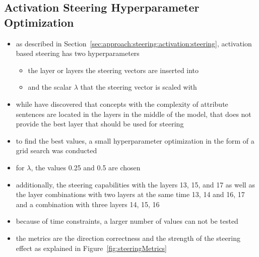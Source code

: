 \subsection{Activation Steering Hyperparameter Optimization}%
\label{sec:evaluation:steering:activationHPO}
\begin{itemize}
  \item as described in Section~\ref{sec:approach:steering:activation:steering}, activation based steering has two hyperparameters
        \begin{itemize}
          \item the layer or layers the steering vectors are inserted into
          \item and the scalar \(\lambda\) that the steering vector is scaled with
        \end{itemize}
  \item while \citet{konenStyleVectorsSteering2024,bogdanEmergentEffectsScaling2025} have discovered that concepts with the complexity of attribute sentences are located in the layers in the middle of the model, that does not provide the best layer that should be used for steering
  \item to find the best values, a small hyperparameter optimization in the form of a grid search was conducted
  \item for \(\lambda\), the values \num{0.25} and \num{0.5} are chosen
  \item additionally, the steering capabilities with the layers \num{13}, \num{15}, and  \num{17} as well as the layer combinations with two layers at the same time  \num{13}, \num{14} and \num{16}, \num{17} and a combination with three layers \num{14}, \num{15}, \num{16}
  \item because of time constraints, a larger number of values can not be tested
  \item the metrics are the direction correctness and the strength of the steering effect as explained in Figure~\ref{fig:steeringMetrics}
\end{itemize}
